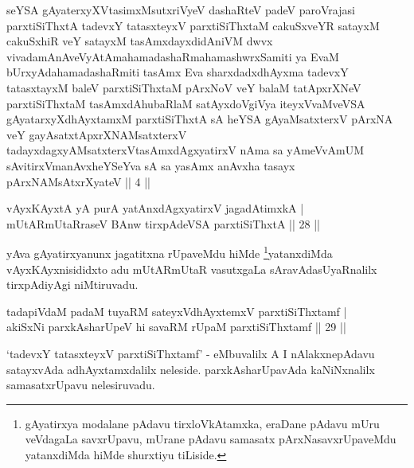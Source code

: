 \begin{kandikeshl}
seYSA gAyaterxyXVtasimxMsutxriVyeV dashaRteV padeV paroVrajasi parxtiSiThxtA tadevxY tatasxteyxV parxtiSiThxtaM cakuSxveYR satayxM cakuSxhiR veY satayxM tasAmxdayxdidAniVM dwvx vivadamAnAveVyAtAmahamadashaRmahamashwrxSamiti ya EvaM bUrxyAdahamadashaRmiti tasAmx Eva sharxdadxdhAyxma tadevxY tatasxtayxM baleV parxtiSiThxtaM pArxNoV veY balaM tatApxrXNeV parxtiSiThxtaM tasAmxdAhubaRlaM satAyxdoVgiVya iteyxVvaMveVSA gAyatarxyXdhAyxtamxM parxtiSiThxtA sA heYSA gAyaMsatxterxV pArxNA veY gayAsatxtApxrXNAMsatxterxV tadayxdagxyAMsatxterxV\break tasAmxdAgxyatirxV nAma sa yAmeVvAmUM sAvitirxVmanAvxheYSeYva sA sa yasAmx anAvxha tasayx pArxNAMsAtxrXyateV || 4 ||
\end{kandikeshl}


\begin{shl}
vAyxKAyxtA yA purA yatAnxdAgxyatirxV jagadAtimxkA | \\
mUtARmUtaRraseV BAnw tirxpAdeVSA parxtiSiThxtA \hfill ||  28 || 
\end{shl}

\begin{artha} 
yAva gAyatirxyanunx jagatitxna rUpaveMdu hiMde 
\footnote{gAyatirxya modalane pAdavu tirxloVkAtamxka, eraDane 
pAdavu mUru veVdagaLa savxrUpavu, mUrane pAdavu samasatx 
pArxNasavxrUpaveMdu yatanxdiMda hiMde shurxtiyu tiLiside.}yatanxdiMda  vAyxKAyx\-nisididxto adu mUtARmUtaR vasutxgaLa 
sAravAda\break sUyaRnalilx tirxpAdiyAgi niMtiruvadu.
\end{artha}


\begin{shl}
tadapiVdaM padaM tuyaRM sateyxV\s dhAyxtemxV parxtiSiThxtamf | \\
akiSxNi parxkAsharUpeV hi savaRM rUpaM parxtiSiThxtamf \hfill ||  29 ||
\end{shl}

\begin{artha} 
`tadevxY tatasxteyxV parxtiSiThxtamf' - eMbuvalilx A I nAlakxnepAdavu 
satayxvAda adhAyxtamxdalilx neleside. parxkAsharUpavAda kaNiNxnalilx 
samasatxrUpavu nelesiruvadu.
\end{artha}

